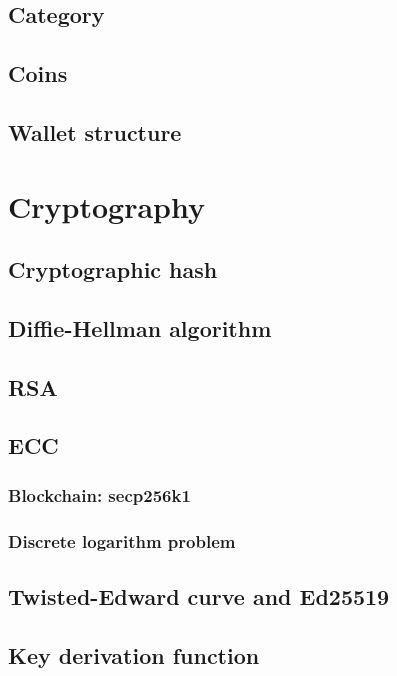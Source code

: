 \subsection{Category}

\subsection{Coins}

\subsection{Wallet structure}

\section{Cryptography}

\subsection{Cryptographic hash}

\subsection{Diffie-Hellman algorithm}

\subsection{RSA}

\subsection{ECC}

\subsubsection{Blockchain: secp256k1}

\subsubsection{Discrete logarithm problem}

\subsection{Twisted-Edward curve and Ed25519}

\subsection{Key derivation function}
